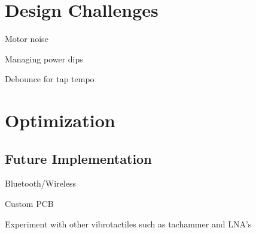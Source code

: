 \section{Design Challenges}

Motor noise

Managing power dips



Debounce for tap tempo

\section{Optimization}

\subsection{Future Implementation}

Bluetooth/Wireless

Custom PCB

Experiment with other vibrotactiles such as tachammer and LNA's
